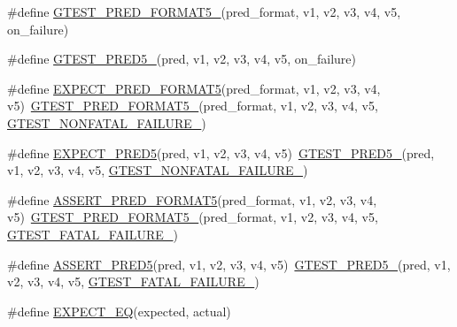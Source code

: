 \begin{DoxyCompactItemize}
\item 
\#define \hyperlink{fused-src_2gtest_2gtest_8h_a107623ee191560f703a3fdc983803c8e}{G\-T\-E\-S\-T\-\_\-\-P\-R\-E\-D\-\_\-\-F\-O\-R\-M\-A\-T5\-\_\-}(pred\-\_\-format, v1, v2, v3, v4, v5, on\-\_\-failure)
\item 
\#define \hyperlink{fused-src_2gtest_2gtest_8h_a2c42692f7d910dc2fe57869883190e6c}{G\-T\-E\-S\-T\-\_\-\-P\-R\-E\-D5\-\_\-}(pred, v1, v2, v3, v4, v5, on\-\_\-failure)
\item 
\#define \hyperlink{fused-src_2gtest_2gtest_8h_a74beddf9661e4460f9969fe211b9e80e}{E\-X\-P\-E\-C\-T\-\_\-\-P\-R\-E\-D\-\_\-\-F\-O\-R\-M\-A\-T5}(pred\-\_\-format, v1, v2, v3, v4, v5)~\hyperlink{gtest__pred__impl_8h_a107623ee191560f703a3fdc983803c8e}{G\-T\-E\-S\-T\-\_\-\-P\-R\-E\-D\-\_\-\-F\-O\-R\-M\-A\-T5\-\_\-}(pred\-\_\-format, v1, v2, v3, v4, v5, \hyperlink{gtest-internal_8h_a6cb7482cfa03661a91c698eb5895f642}{G\-T\-E\-S\-T\-\_\-\-N\-O\-N\-F\-A\-T\-A\-L\-\_\-\-F\-A\-I\-L\-U\-R\-E\-\_\-})
\item 
\#define \hyperlink{fused-src_2gtest_2gtest_8h_adbfcc13f3b3d14c42a7fbd41573932bf}{E\-X\-P\-E\-C\-T\-\_\-\-P\-R\-E\-D5}(pred, v1, v2, v3, v4, v5)~\hyperlink{gtest__pred__impl_8h_a2c42692f7d910dc2fe57869883190e6c}{G\-T\-E\-S\-T\-\_\-\-P\-R\-E\-D5\-\_\-}(pred, v1, v2, v3, v4, v5, \hyperlink{gtest-internal_8h_a6cb7482cfa03661a91c698eb5895f642}{G\-T\-E\-S\-T\-\_\-\-N\-O\-N\-F\-A\-T\-A\-L\-\_\-\-F\-A\-I\-L\-U\-R\-E\-\_\-})
\item 
\#define \hyperlink{fused-src_2gtest_2gtest_8h_abd7cb4f36d6aa2cb346ab3ac812568f3}{A\-S\-S\-E\-R\-T\-\_\-\-P\-R\-E\-D\-\_\-\-F\-O\-R\-M\-A\-T5}(pred\-\_\-format, v1, v2, v3, v4, v5)~\hyperlink{gtest__pred__impl_8h_a107623ee191560f703a3fdc983803c8e}{G\-T\-E\-S\-T\-\_\-\-P\-R\-E\-D\-\_\-\-F\-O\-R\-M\-A\-T5\-\_\-}(pred\-\_\-format, v1, v2, v3, v4, v5, \hyperlink{gtest-internal_8h_a0f9a4c3ea82cc7bf4478eaffdc168358}{G\-T\-E\-S\-T\-\_\-\-F\-A\-T\-A\-L\-\_\-\-F\-A\-I\-L\-U\-R\-E\-\_\-})
\item 
\#define \hyperlink{fused-src_2gtest_2gtest_8h_af8e510af2b4a14d90eef66ace17d1c30}{A\-S\-S\-E\-R\-T\-\_\-\-P\-R\-E\-D5}(pred, v1, v2, v3, v4, v5)~\hyperlink{gtest__pred__impl_8h_a2c42692f7d910dc2fe57869883190e6c}{G\-T\-E\-S\-T\-\_\-\-P\-R\-E\-D5\-\_\-}(pred, v1, v2, v3, v4, v5, \hyperlink{gtest-internal_8h_a0f9a4c3ea82cc7bf4478eaffdc168358}{G\-T\-E\-S\-T\-\_\-\-F\-A\-T\-A\-L\-\_\-\-F\-A\-I\-L\-U\-R\-E\-\_\-})
\item 
\#define \hyperlink{fused-src_2gtest_2gtest_8h_aff8385840165a184edc29446aa51936f}{E\-X\-P\-E\-C\-T\-\_\-\-E\-Q}(expected, actual)

\end{DoxyCompactItemize}
